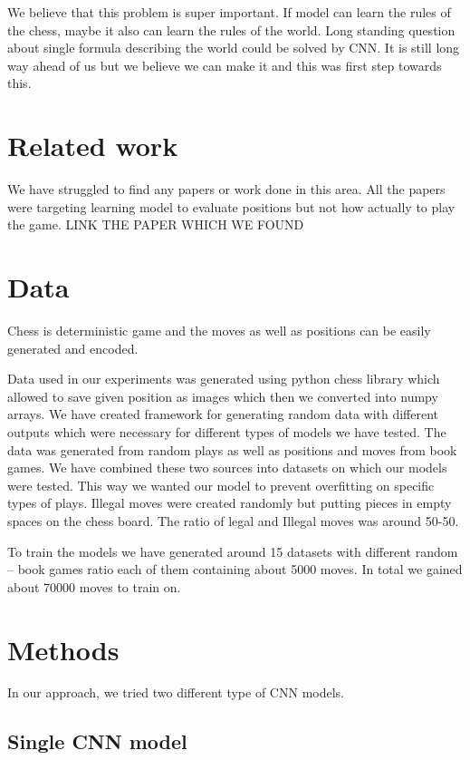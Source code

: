 \documentclass[10pt,twocolumn,letterpaper]{article}
\begin{document}
We believe that this problem is super important. If model can learn the rules of
the chess, maybe it also can learn the rules of the world. Long standing
question about single formula describing the world could be solved by CNN. It is
still long way ahead of us but we believe we can make it and this was first step
towards this.

\section{Related work}

We have struggled to find any papers or work done in this area. All the papers
were targeting learning model to evaluate positions but not how actually to play
the game. LINK THE PAPER WHICH WE FOUND

\section{Data}

Chess is deterministic game and the moves as well as positions can be easily
generated and encoded.

Data used in our experiments was generated using python chess library which
allowed to save given position as images which then we converted into numpy
arrays. We have created framework for generating random data with different
outputs which were necessary for different types of models we have tested. The
data was generated from random plays as well as positions and moves from book
games. We have combined these two sources into datasets on which our models were
tested. This way we wanted our model to prevent overfitting on specific types of
plays. Illegal moves were created randomly but putting pieces in empty spaces on
the chess board. The ratio of legal and Illegal moves was around 50-50.

To train the models we have generated around 15 datasets with different random
-- book games ratio each of them containing about 5000 moves. In total we gained
about 70000 moves to train on.

\section{Methods}

In our approach, we tried two different type of CNN models.

\subsection{Single CNN model}
\end{document}
